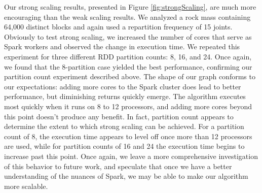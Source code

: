 Our strong scaling results, presented in Figure \ref{fig:strongScaling}, are much more encouraging than the weak scaling results. We analyzed a rock mass containing 64,000 distinct blocks and again used a repartition frequency of 15 joints. Obviously to test strong scaling, we increased the number of cores that serve as Spark workers and observed the change in execution time. We repeated this experiment for three different RDD partition counts: 8, 16, and 24. Once again, we found that the 8-partition case yielded the best performance, confirming our partition count experiment described above. The shape of our graph conforms to our expectations: adding more cores to the Spark cluster does lead to better performance, but diminishing returns quickly emerge. The algorithm executes most quickly when it runs on 8 to 12 processors, and adding more cores beyond this point doesn't produce any benefit. In fact, partition count appears to determine the extent to which strong scaling can be achieved. For a partition count of 8, the execution time appears to level off once more than 12 processors are used, while for partition counts of 16 and 24 the execution time begins to increase past this point. Once again, we leave a more comprehensive investigation of this behavior to future work, and speculate that once we have a better understanding of the nuances of Spark, we may be able to make our algorithm more scalable.

